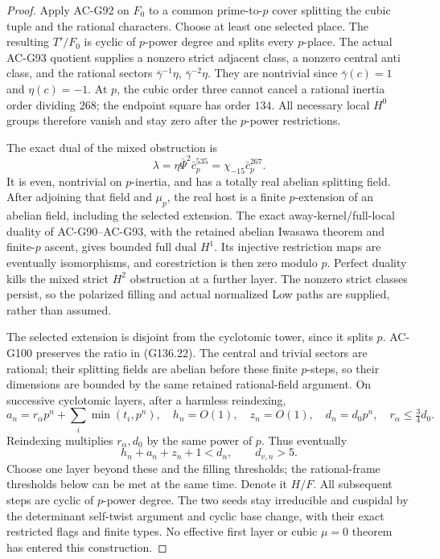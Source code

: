 \begin{proof}
Apply AC-G92 on \(F_0\) to a common prime-to-\(p\) cover
splitting the cubic tuple and the rational characters.
Choose at least one selected place.  The resulting
\(T'/F_0\) is cyclic of \(p\)-power degree and splits
every \(p\)-place.  The actual AC-G93 quotient supplies
a nonzero strict adjacent class, a nonzero central anti
class, and the rational sectors
\(\bar\gamma^{-1}\eta\), \(\bar\gamma^{-2}\eta\).
They are nontrivial since \(\bar\gamma(c)=1\) and
\(\eta(c)=-1\).  At \(p\), the cubic order three cannot
cancel a rational inertia order dividing \(268\); the
endpoint square has order \(134\).  All necessary local
\(H^0\) groups therefore vanish and stay zero after the
\(p\)-power restrictions.

The exact dual of the mixed obstruction is
\[
 \lambda=\eta\bar\Psi^2\bar c_p^{535}
         =\chi_{-15}\bar c_p^{267}.
 \tag{G136.24}
\]
It is even, nontrivial on \(p\)-inertia, and has a totally
real abelian splitting field.  After adjoining that field
and \(\mu_p\), the real host is a finite \(p\)-extension
of an abelian field, including the selected extension.
The exact away-kernel/full-local duality of AC-G90--AC-G93,
with the retained abelian Iwasawa theorem and finite-\(p\)
ascent, gives bounded full dual \(H^1\).
Its injective restriction maps are eventually isomorphisms,
and corestriction is then zero modulo \(p\).
Perfect duality kills the mixed strict \(H^2\) obstruction
at a further layer.  The nonzero strict classes persist,
so the polarized filling and actual normalized Low paths
are supplied, rather than assumed.

The selected extension is disjoint from the cyclotomic tower,
since it splits \(p\).  AC-G100 preserves the ratio in
(G136.22).  The central and trivial sectors are rational;
their splitting fields are abelian before these finite
\(p\)-steps, so their dimensions are bounded by the same
retained rational-field argument.  On successive cyclotomic
layers, after a harmless reindexing,
\[
 a_n=r_\alpha p^n+\sum_i\min(t_i,p^n),\quad
 h_n=O(1),\quad z_n=O(1),\quad
 d_n=d_0p^n,\quad r_\alpha\le\tfrac34d_0.
 \tag{G136.25}
\]
Reindexing multiplies \(r_\alpha,d_0\) by the same power of
\(p\).  Thus eventually
\[
                     h_n+a_n+z_n+1<d_n,\qquad d_{v,n}>5.
 \tag{G136.26}
\]
Choose one layer beyond these and the filling thresholds;
the rational-frame thresholds below can be met at the same
time.  Denote it \(H/F\).
All subsequent steps are cyclic of \(p\)-power degree.
The two seeds stay irreducible and cuspidal by the determinant
self-twist argument and cyclic base change, with their exact
restricted flags and finite types.
No effective first layer or cubic \(\mu=0\) theorem has
entered this construction.


\end{proof}
